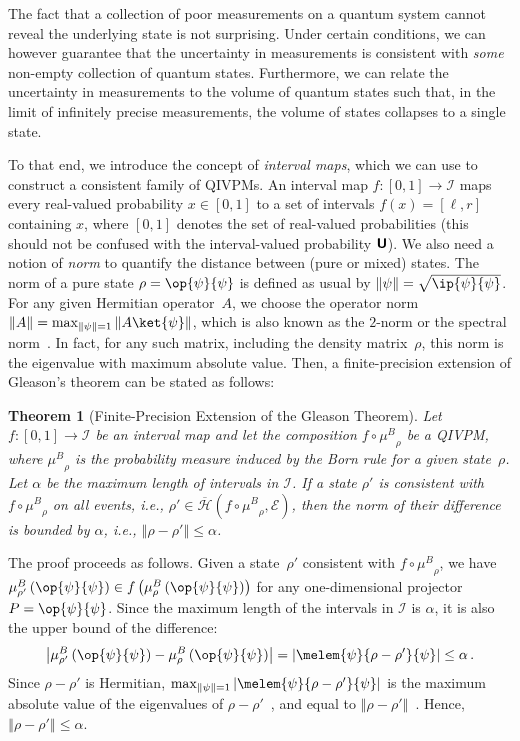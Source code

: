 \documentclass[english,reprint, aps, prl,superscriptaddress, showpacs,
showkeys, longbibliography, amsmath, amssymb, floatfix]{revtex4-1}
\theoremstyle{plain}
\newtheorem{thm}{Theorem}
\theoremstyle{definition}
\newcommand{\Hilb}{\mathcal{H}}
\newcommand{\events}{\ensuremath{\mathcal{E}}}
\newcommand{\interval}[1]{{\normalfont\textsf{\textbf{#1}}}}
\newcommand{\unknown}{\interval{U}}
\newcommand{\proj}[1]{\op{#1}{#1}}
\newcommand{\coreBorn}{\ensuremath{\overline{\Hilb}}}
\newcommand{\muB}{\ensuremath{\mu^{B}}}
\begin{document}
The fact that a collection of poor measurements on a quantum system
cannot reveal the underlying state is not surprising. Under certain
conditions, we can however guarantee that the uncertainty in measurements
is consistent with \emph{some} non-empty collection of quantum states.
Furthermore, we can relate the uncertainty in measurements to the
volume of quantum states such that, in the limit of infinitely precise
measurements, the volume of states collapses to a single state.

To that end, we introduce the concept of \emph{interval maps}, which
we can use to construct a consistent family of QIVPMs.
An interval map $f:\left[0,1\right]\rightarrow\mathscr{I}$
maps every real-valued probability $x\in\left[0,1\right]$ to a set
of intervals $f\left(x\right)=\left[\ell,r\right]$ containing $x$,
where $\left[0,1\right]$ denotes the set of real-valued probabilities
(this should not be confused with
the interval-valued probability $\unknown$).
We also need a notion of \emph{norm} to quantify the
distance between (pure or mixed) states. The norm of a pure state
$\rho=\proj{\psi}$ is defined as usual by $\left\Vert \psi\right\Vert =\sqrt{\ip{\psi}{\psi}}$.
For any given Hermitian operator~$A$, we choose the
operator norm $\left\Vert A\right\Vert =\max_{\left\Vert \psi\right\Vert =1}\left\Vert A\ket{\psi}\right\Vert $,
which is also known as the $2$-norm or the spectral norm~\cite{RobertsVarberg1973,peres1995quantum,GolubVanLoan1996,Foucart2012}.
In fact, for any such matrix, including the density matrix~$\rho$,
this norm is the eigenvalue with maximum absolute value. Then, a
finite-precision extension of Gleason's theorem can be stated as
follows:

\begin{thm}[Finite-Precision Extension of the Gleason Theorem]\label{thm:Finite-precision-Gleason}Let
$f:\left[0,1\right]\rightarrow\mathscr{I}$ be an interval map
and let the composition $f\circ\muB_{\rho}$ be a QIVPM, where
$\muB_{\rho}$ is the
probability measure induced by the Born rule for a given state~$\rho$.
Let $\alpha$ be the maximum length of intervals in $\mathscr{I}$.
If a state $\rho'$ is consistent with $f\circ\muB_{\rho}$ on all
events, i.e., $\rho'\in\coreBorn\left(f\circ\muB_{\rho},\events\right)$,
then the norm of their difference is bounded by $\alpha$, i.e., $\left\Vert \rho-\rho'\right\Vert \le\alpha$.\end{thm}

The proof proceeds as follows. Given a state~$\rho'$ consistent
with $f\circ\muB_{\rho}$, we have $\muB_{\rho'}\left(\proj{\psi}\right)\in f\left(\muB_{\rho}\left(\proj{\psi}\right)\right)$
for any one-dimensional projector $P=\proj{\psi}$. Since the maximum
length of the intervals in $\mathscr{I}$ is $\alpha$, it is also
the upper bound of the difference: 
\[
\left|\muB_{\rho'}\left(\proj{\psi}\right)-\muB_{\rho}\left(\proj{\psi}\right)\right|=\left|\melem{\psi}{\rho-\rho'}{\psi}\right|\le\alpha\,.
\]
Since $\rho-\rho'$ is Hermitian, $\max_{\left\Vert \psi\right\Vert =1}\left|\melem{\psi}{\rho-\rho'}{\psi}\right|$
is the maximum absolute value of the eigenvalues of $\rho-\rho'$~\cite{544199},
and equal to $\left\Vert \rho-\rho'\right\Vert $~\cite{GolubVanLoan1996,Foucart2012}.
Hence, $\left\Vert \rho-\rho'\right\Vert \le\alpha$.
\end{document}
